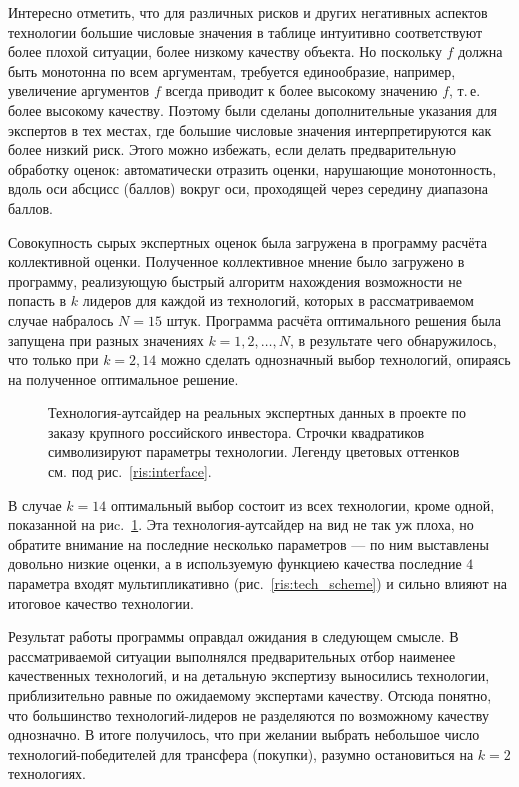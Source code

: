 Интересно отметить, что для различных рисков и других негативных аспектов технологии большие числовые значения в таблице интуитивно соответствуют более плохой ситуации, более низкому качеству объекта. Но поскольку $f$ должна быть монотонна по всем аргументам, требуется единообразие, например, увеличение аргументов $f$  всегда приводит к более высокому значению $f$, т.\,е. более высокому качеству. Поэтому были сделаны дополнительные указания для экспертов в тех местах, где большие числовые значения интерпретируются как более низкий риск. Этого можно избежать, если делать предварительную обработку оценок: автоматически отразить оценки, нарушающие монотонность, вдоль оси абсцисс (баллов) вокруг оси, проходящей через середину диапазона баллов.

Совокупность сырых экспертных оценок была загружена в программу расчёта коллективной оценки. Полученное коллективное мнение было загружено в программу, реализующую быстрый алгоритм нахождения возможности не попасть в $k$ лидеров для каждой из технологий, которых в рассматриваемом случае набралось $N = 15$ штук. Программа расчёта оптимального решения была запущена при разных значениях $k = 1, 2, \ldots, N$, в результате чего обнаружилось, что только при $k=2, 14$ можно сделать однозначный выбор технологий, опираясь на полученное оптимальное решение.  

\begin{figure}[h]
\caption{\small Технология-аутсайдер на реальных экспертных данных в проекте по заказу крупного российского инвестора. Строчки квадратиков символизируют параметры технологии. Легенду цветовых оттенков см. под рис.~\ref{ris:interface}.}
\label{ris:tech_13}
\end{figure}

В случае $k = 14$ оптимальный выбор состоит из всех технологии, кроме одной, показанной на риc.~\ref{ris:tech_13}. Эта технология-аутсайдер на вид не так уж плоха, но обратите внимание на последние несколько параметров --- по ним выставлены довольно низкие оценки, а в используемую функциею качества последние $4$ параметра входят мультипликативно (рис.~\ref{ris:tech_scheme}) и сильно влияют на итоговое качество технологии.

Результат работы программы оправдал ожидания в следующем смысле. В рассматриваемой ситуации выполнялся предварительных отбор наименее качественных технологий, и на детальную экспертизу выносились технологии, приблизительно равные по ожидаемому экспертами качеству. Отсюда понятно, что большинство технологий-лидеров не разделяются по возможному качеству однозначно. В итоге получилось, что при желании выбрать небольшое число технологий-победителей для трансфера (покупки), разумно остановиться на $k=2$ технологиях. 

